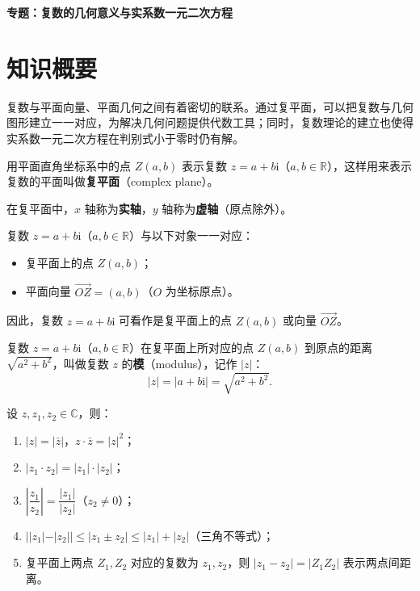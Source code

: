 \documentclass[11pt]{ctexrep}
\begin{document}
\begin{center}
    {\LARGE\bfseries 专题：复数的几何意义与实系数一元二次方程}
\end{center}

\section*{知识概要}

复数与平面向量、平面几何之间有着密切的联系。通过复平面，可以把复数与几何图形建立一一对应，为解决几何问题提供代数工具；同时，复数理论的建立也使得实系数一元二次方程在判别式小于零时仍有解。

\begin{definition}[复平面]
    用平面直角坐标系中的点 $Z(a, b)$ 表示复数 $z = a + b\mathrm{i}$（$a, b \in \mathbb{R}$），这样用来表示复数的平面叫做\textbf{复平面}（complex plane）。
    
    在复平面中，$x$ 轴称为\textbf{实轴}，$y$ 轴称为\textbf{虚轴}（原点除外）。
\end{definition}

\begin{property}[复数的几何表示]
    复数 $z = a + b\mathrm{i}$（$a, b \in \mathbb{R}$）与以下对象一一对应：
    \begin{itemize}
        \item 复平面上的点 $Z(a, b)$；
        \item 平面向量 $\overrightarrow{OZ} = (a, b)$（$O$ 为坐标原点）。
    \end{itemize}
    因此，复数 $z = a + b\mathrm{i}$ 可看作是复平面上的点 $Z(a, b)$ 或向量 $\overrightarrow{OZ}$。
\end{property}

\begin{definition}[复数的模]
    复数 $z = a + b\mathrm{i}$（$a, b \in \mathbb{R}$）在复平面上所对应的点 $Z(a, b)$ 到原点的距离 $\sqrt{a^2 + b^2}$，叫做复数 $z$ 的\textbf{模}（modulus），记作 $|z|$：
    \[
        |z| = |a + b\mathrm{i}| = \sqrt{a^2 + b^2}.
    \]
\end{definition}

\begin{property}[复数模的性质]
    设 $z, z_1, z_2 \in \mathbb{C}$，则：
    \begin{enumerate}
        \item $|z| = |\bar{z}|$，$z \cdot \bar{z} = |z|^2$；
        \item $|z_1 \cdot z_2| = |z_1| \cdot |z_2|$；
        \item $\left|\dfrac{z_1}{z_2}\right| = \dfrac{|z_1|}{|z_2|}$（$z_2 \neq 0$）；
        \item $||z_1| - |z_2|| \leq |z_1 \pm z_2| \leq |z_1| + |z_2|$（三角不等式）；
        \item 复平面上两点 $Z_1, Z_2$ 对应的复数为 $z_1, z_2$，则 $|z_1 - z_2| = |Z_1Z_2|$ 表示两点间距离。
    \end{enumerate}
\end{property}
\end{document}

